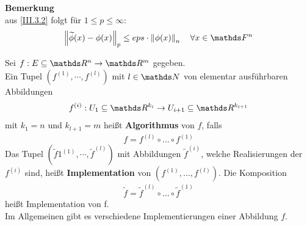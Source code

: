 \textbf{Bemerkung}\\
aus \eqref{III.3.2} folgt für $1\leq p\leq \infty$:
\begin{gather}
  \nn{\widetilde{\phi}(x)-\phi(x)}_p \leq eps\cdot\nn{\phi(x)}_n 
  \quad \forall x\in\F^n \label{III.3.3}
\end{gather}


\begin{Defe}
  Sei $f:E\subseteq \Ren \rightarrow \R^m$ gegeben.\\
  Ein Tupel $\left(f^{(1)},\cdots ,f^{(l)}\right)$ mit $l\in \N$ von elementar ausführbaren
  Abbildungen
  \begin{gather*}
    f^{(i)}: U_1\subseteq \R^{k_i} \rightarrow U_{i+1}\subseteq \R^{k_{i+1}}
  \end{gather*}
  mit $k_1=n$ und $k_{l+1}=m$ heißt \textbf{Algorithmus} von $f$, falls
  \begin{gather*}
    f=f	^{(l)}\circ \dotsc \circ f^{(1)}
  \end{gather*}
  Das Tupel $(\widetilde{f}1^{(1)},\cdots ,\widetilde{f}^{(l)})$ mit Abbildungen $\widetilde{f}^{(i)}$, welche Realisierungen der $f^{(i)}$ sind,
  heißt \textbf{Implementation} von 
  $\left(f^{(1)},\dotsc ,f^{(l)}\right)$.
  Die Komposition 
  \begin{gather*}
    \widetilde{f}=\widetilde{f}	^{(l)}\circ \dotsc \circ \widetilde{f}^{(1)}
  \end{gather*}
  heißt Implementation von f. \\
  Im Allgemeinen gibt es verschiedene Implementierungen einer Abbildung $f$.
\end{Defe}



